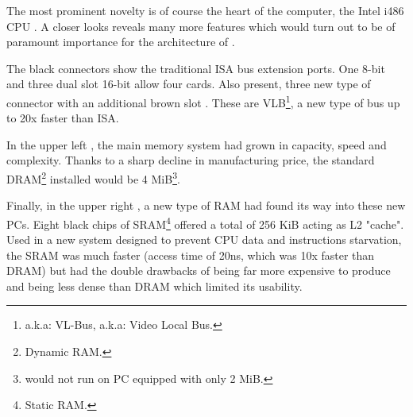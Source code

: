 \par
The most prominent novelty is of course the heart of the computer, the Intel i486 CPU . A closer looks reveals many more features which would turn out to be of paramount importance for the architecture of \doom.\\
\par 
The black connectors show the traditional ISA bus extension ports. One 8-bit  and three dual slot 16-bit  allow four cards. Also present, three new type of connector with an additional brown slot . These are VLB\footnote{a.k.a: VL-Bus, a.k.a: Video Local Bus.}, a new type of bus up to 20x faster than ISA.

\par
In the upper left , the main memory system had grown in capacity, speed and complexity. Thanks to a sharp decline in manufacturing price, the standard DRAM\footnote{Dynamic RAM.} installed would be 4 MiB\footnote{\doom{} would not run on PC equipped with only 2 MiB.}.\\
\par
 Finally, in the upper right , a new type of RAM had found its way into these new PCs. Eight black chips of SRAM\footnote{Static RAM.} offered a total of 256 KiB acting as L2 "cache". Used in a new system designed to prevent CPU data and instructions starvation, the SRAM was much faster (access time of 20ns, which was 10x faster than DRAM) but had the double drawbacks of being far more expensive to produce and being less dense than DRAM which limited its usability.



